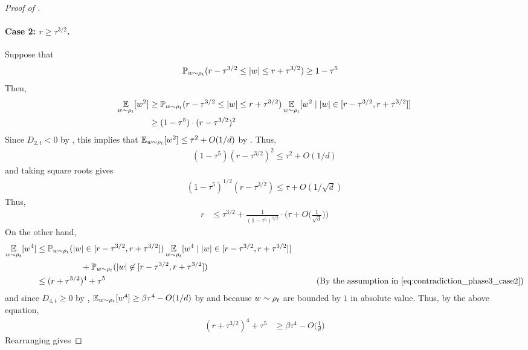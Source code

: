 \begin{proof}[Proof of ]
\paragraph{Case 2: $r \geq \tau^{3/2}$.} 
Suppose that
\begin{align} \label{eq:contradiction_phase3_case2}
\mathbb{P}_{w \sim \rho_t}(r - \tau^{3/2} \leq |w| \leq r + \tau^{3/2})
& \geq 1 - \tau^5
\end{align}
Then,
\begin{align}
\operatorname*{\mathbb{E}}_{w \sim \rho_t}[w^2] 
& \geq \mathbb{P}_{w \sim \rho_t}(r - \tau^{3/2} \leq |w| \leq r + \tau^{3/2}) \operatorname*{\mathbb{E}}_{w \sim \rho_t}[w^2 \mid |w| \in [r - \tau^{3/2}, r + \tau^{3/2}]] \\
& \geq (1 - \tau^5) \cdot (r - \tau^{3/2})^2
\end{align}
Since $D_{2, t} < 0$ by , this implies that $\operatorname*{\mathbb{E}}_{w \sim \rho_t}[w^2] \leq \tau^2 + O(1/d)$ by . Thus,
\begin{align}
(1 - \tau^5) (r - \tau^{3/2})^2 \leq \tau^2 + O(1/d)
\end{align}
and taking square roots gives
\begin{align}
(1 - \tau^5)^{1/2} (r - \tau^{3/2}) \leq \tau + O(1/\sqrt{d})
\end{align}
Thus,
\begin{align} \label{eq:r_upper_bound_phase3_case2}
r
& \leq \tau^{3/2} + \frac{1}{(1 - \tau^5)^{1/2}} \cdot \Big(\tau + O\Big(\frac{1}{\sqrt{d}}\Big)\Big)
\end{align}
On the other hand,
\begin{align}
\E_{\w \sim \rho_t}[\w^4]
& \leq \Prob_{\w \sim \rho_t}(|\w| \in [r - \tau^{3/2}, r + \tau^{3/2}]) \E_{\w \sim \rho_t}[\w^4 \mid |\w| \in [r - \tau^{3/2}, r + \tau^{3/2}]] \\
& \nextlinespace\nextlinespace + \Prob_{\w \sim \rho_t}(|\w| \not\in [r - \tau^{3/2}, r + \tau^{3/2}]) \\
& \leq (r + \tau^{3/2})^4 + \tau^5
& \tag{By the assumption in \Cref{eq:contradiction_phase3_case2}}
\end{align}
and since $D_{4, t} \geq 0$ by , $\operatorname*{\mathbb{E}}_{w \sim \rho_t}[w^4] \geq \beta \tau^4 - O(1/d)$ by  and because $w \sim \rho_t$ are bounded by $1$ in absolute value. Thus, by the above equation,
\begin{align}
(r + \tau^{3/2})^4 + \tau^5 
& \geq \beta \tau^4 - O\Big(\frac{1}{d}\Big)
\end{align}
Rearranging gives

\end{proof}

